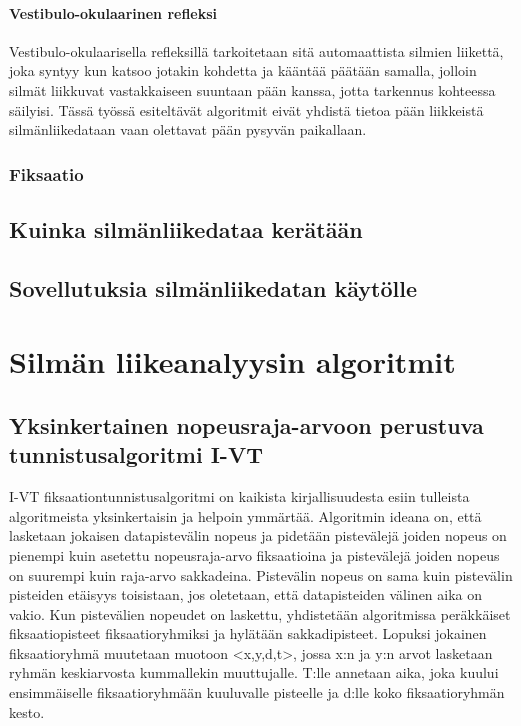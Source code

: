 \paragraph{Vestibulo-okulaarinen refleksi}
Vestibulo-okulaarisella refleksillä tarkoitetaan sitä automaattista silmien liikettä, joka syntyy kun katsoo jotakin kohdetta ja kääntää päätään samalla, jolloin silmät liikkuvat vastakkaiseen suuntaan pään kanssa, jotta tarkennus kohteessa säilyisi.\citep[s.210]{laurutis1986vestibulo} Tässä työssä esiteltävät algoritmit eivät yhdistä tietoa pään liikkeistä silmänliikedataan vaan olettavat pään pysyvän paikallaan.

\subsubsection{Fiksaatio}

\subsection{Kuinka silmänliikedataa kerätään}

\subsection{Sovellutuksia silmänliikedatan käytölle}


\section{Silmän liikeanalyysin algoritmit}
\subsection{Yksinkertainen nopeusraja-arvoon perustuva tunnistusalgoritmi I-VT}
I-VT fiksaationtunnistusalgoritmi on kaikista kirjallisuudesta esiin tulleista algoritmeista yksinkertaisin ja helpoin ymmärtää. Algoritmin ideana on, että lasketaan jokaisen datapistevälin nopeus ja pidetään pistevälejä joiden nopeus on pienempi kuin asetettu nopeusraja-arvo fiksaatioina ja pistevälejä joiden nopeus on suurempi kuin raja-arvo sakkadeina. Pistevälin nopeus on sama kuin pistevälin pisteiden etäisyys toisistaan, jos oletetaan, että datapisteiden välinen aika on vakio. Kun pistevälien nopeudet on laskettu, yhdistetään algoritmissa peräkkäiset fiksaatiopisteet fiksaatioryhmiksi ja hylätään sakkadipisteet. Lopuksi jokainen fiksaatioryhmä muutetaan muotoon <x,y,d,t>, jossa x:n ja y:n arvot lasketaan ryhmän keskiarvosta kummallekin muuttujalle. T:lle annetaan aika, joka kuului ensimmäiselle fiksaatioryhmään kuuluvalle pisteelle ja d:lle koko fiksaatioryhmän kesto. \citep[s. 73]{salvucci2000}

